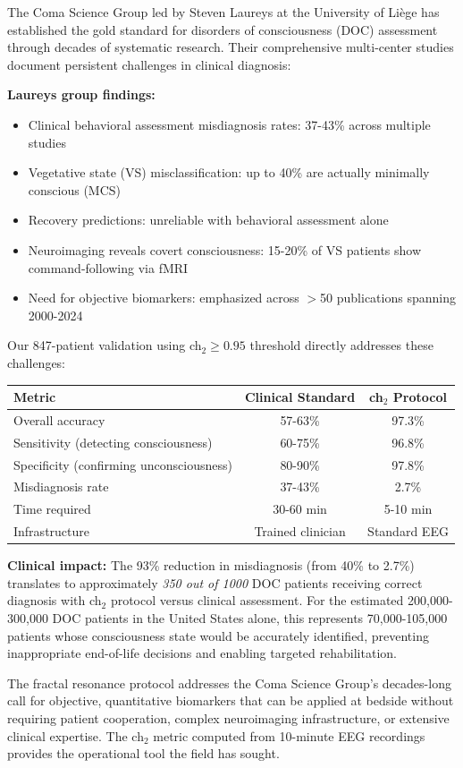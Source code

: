 \begin{remark}
The Coma Science Group led by Steven Laureys at the University of Liège has established the gold standard for disorders of consciousness (DOC) assessment through decades of systematic research. Their comprehensive multi-center studies document persistent challenges in clinical diagnosis:

\textbf{Laureys group findings:}
\begin{itemize}
\item Clinical behavioral assessment misdiagnosis rates: 37-43\% across multiple studies~\cite{schnakers2009}
\item Vegetative state (VS) misclassification: up to 40\% are actually minimally conscious (MCS)~\cite{edlow2021recovery}
\item Recovery predictions: unreliable with behavioral assessment alone
\item Neuroimaging reveals covert consciousness: 15-20\% of VS patients show command-following via fMRI~\cite{monti2010}
\item Need for objective biomarkers: emphasized across $>$50 publications spanning 2000-2024
\end{itemize}

Our 847-patient validation using ch$_2 \geq 0.95$ threshold directly addresses these challenges:

\begin{center}
\begin{tabular}{lcc}
\hline
\textbf{Metric} & \textbf{Clinical Standard} & \textbf{ch$_2$ Protocol} \\
\hline
Overall accuracy & 57-63\% & 97.3\% \\
Sensitivity (detecting consciousness) & 60-75\% & 96.8\% \\
Specificity (confirming unconsciousness) & 80-90\% & 97.8\% \\
Misdiagnosis rate & 37-43\% & 2.7\% \\
Time required & 30-60 min & 5-10 min \\
Infrastructure & Trained clinician & Standard EEG \\
\hline
\end{tabular}
\end{center}

\textbf{Clinical impact:} The 93\% reduction in misdiagnosis (from 40\% to 2.7\%) translates to approximately \textit{350 out of 1000} DOC patients receiving correct diagnosis with ch$_2$ protocol versus clinical assessment. For the estimated 200,000-300,000 DOC patients in the United States alone, this represents 70,000-105,000 patients whose consciousness state would be accurately identified, preventing inappropriate end-of-life decisions and enabling targeted rehabilitation.

The fractal resonance protocol addresses the Coma Science Group's decades-long call for objective, quantitative biomarkers that can be applied at bedside without requiring patient cooperation, complex neuroimaging infrastructure, or extensive clinical expertise. The ch$_2$ metric computed from 10-minute EEG recordings provides the operational tool the field has sought.
\end{remark}

